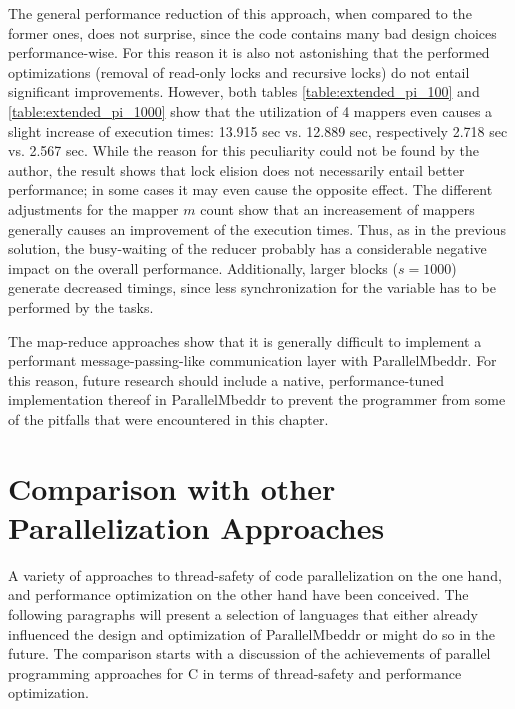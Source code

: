 The general performance reduction of this approach, when compared to the former ones, does not surprise, since the code contains many bad design choices performance-wise. For this reason it is also not astonishing that the performed optimizations (removal of read-only locks and recursive locks) do not entail significant improvements. However, both tables \ref{table:extended_pi_100} and \ref{table:extended_pi_1000} show that the utilization of 4 mappers even causes a slight increase of execution times: 13.915 sec vs. 12.889 sec, respectively 2.718 sec vs. 2.567 sec. While the reason for this peculiarity could not be found by the author, the result shows that lock elision does not necessarily entail better performance; in some cases it may even cause the opposite effect. The different adjustments for the mapper $m$ count show that an increasement of mappers generally causes an improvement of the execution times. Thus, as in the previous solution, the busy-waiting of the reducer probably has a considerable negative impact on the overall performance. Additionally, larger blocks ($s = 1000$) generate decreased timings, since less synchronization for the  variable has to be performed by the tasks.

The map-reduce approaches show that it is generally difficult to implement a performant message-passing-like communication layer with ParallelMbeddr. For this reason, future research should include a native, performance-tuned implementation thereof in ParallelMbeddr to prevent the programmer from some of the pitfalls that were encountered in this chapter.

\section{Comparison with other Parallelization Approaches}
A variety of approaches to thread-safety of code parallelization on the one hand, and performance optimization on the other hand have been conceived. The following paragraphs will present a selection of languages that either already influenced the design and optimization of ParallelMbeddr or might do so in the future. The comparison starts with a discussion of the achievements of parallel programming approaches for C in terms of thread-safety and performance optimization. 

